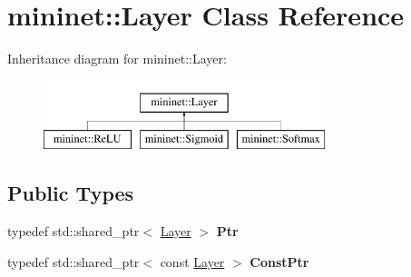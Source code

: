 \hypertarget{classmininet_1_1_layer}{}\section{mininet\+:\+:Layer Class Reference}
\label{classmininet_1_1_layer}
Inheritance diagram for mininet\+:\+:Layer\+:\begin{figure}[H]
\begin{center}
\leavevmode
\includegraphics[height=2.000000cm]{classmininet_1_1_layer}
\end{center}
\end{figure}
\subsection*{Public Types}
\begin{DoxyCompactItemize}
\item 
\hypertarget{classmininet_1_1_layer_a16a0db407855771f9b7465ff1551f8cb}{}\label{classmininet_1_1_layer_a16a0db407855771f9b7465ff1551f8cb} 
typedef std\+::shared\+\_\+ptr$<$ \hyperlink{classmininet_1_1_layer}{Layer} $>$ {\bfseries Ptr}
\item 
\hypertarget{classmininet_1_1_layer_a788af6d5c8e9588770e6717776621201}{}\label{classmininet_1_1_layer_a788af6d5c8e9588770e6717776621201} 
typedef std\+::shared\+\_\+ptr$<$ const \hyperlink{classmininet_1_1_layer}{Layer} $>$ {\bfseries Const\+Ptr}
\end{DoxyCompactItemize}
